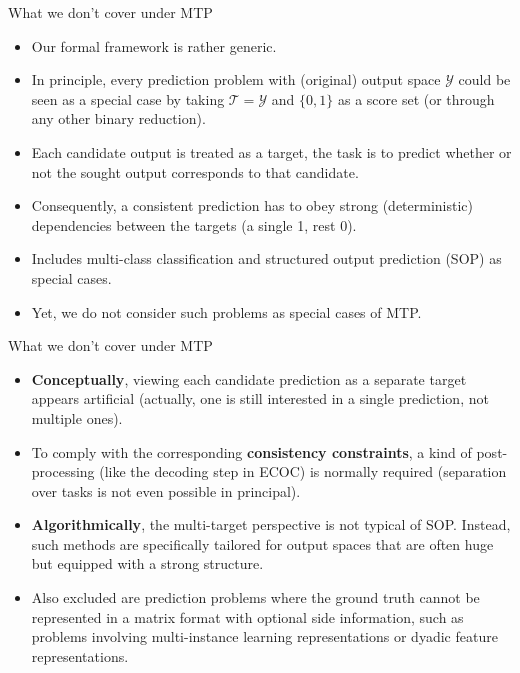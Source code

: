 \documentclass[]{beamer}
\renewcommand{\emph}[1]{\textbf{\color{putblue}#1}}
\begin{document}
\begin{frame}{What we don't cover under MTP}
\begin{itemize}
\item
Our formal framework is rather generic.
\item
In principle, every prediction problem with (original) output space $\mathcal{Y}$ could be seen as a special case by taking $\mathcal{T} = \mathcal{Y}$ and $\{0,1\}$ as a score set (or through any other binary reduction). 
\item Each candidate output is treated as a target, the task is to predict whether or not the sought output corresponds to that candidate. 
\item Consequently, a consistent prediction has to obey strong (deterministic) dependencies between the targets (a single 1, rest 0).  
\item Includes multi-class classification and structured output prediction (SOP) as special cases.
\item
Yet, we do not consider such problems as special cases of MTP.
\end{itemize}
\end{frame}

\begin{frame}{What we don't cover under MTP}
\begin{itemize}

\item \emph{Conceptually}, viewing each candidate prediction as a separate target appears artificial (actually, one is still interested in a single prediction, not multiple ones). 
\item To comply with the corresponding \emph{consistency constraints}, a kind of post-processing (like the decoding step in ECOC) is normally required (separation over tasks is not even possible in principal).

\medskip 

\item \emph{Algorithmically}, the multi-target perspective is not typical of SOP. Instead, such methods are specifically tailored for output spaces that are often huge but equipped with a strong structure. 

\medskip 
\item
Also excluded are prediction problems where the ground truth cannot be represented in a matrix format with optional side information, such as problems involving multi-instance learning representations or dyadic feature representations. 
\end{itemize}
\end{frame}
\end{document}

